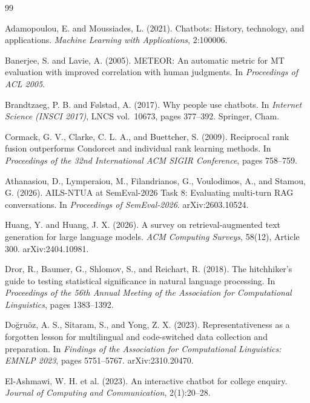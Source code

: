 \documentclass[a4paper,twoside]{article}
\begin{document}
{\small
\begin{thebibliography}{99}

 Adamopoulou, E. and Moussiades, L. (2021). Chatbots: History, technology, and applications. \textit{Machine Learning with Applications}, 2:100006.

 Banerjee, S. and Lavie, A. (2005). METEOR: An automatic metric for MT evaluation with improved correlation with human judgments. In \textit{Proceedings of ACL 2005}.

 Brandtzaeg, P. B. and F{\o}lstad, A. (2017). Why people use chatbots. In \textit{Internet Science (INSCI 2017)}, LNCS vol.\ 10673, pages 377--392. Springer, Cham.

 Cormack, G. V., Clarke, C. L. A., and Buettcher, S. (2009). Reciprocal rank fusion outperforms Condorcet and individual rank learning methods. In \textit{Proceedings of the 32nd International ACM SIGIR Conference}, pages 758--759.

 Athanasiou, D., Lymperaiou, M., Filandrianos, G., Voulodimos, A., and Stamou, G. (2026). AILS-NTUA at SemEval-2026 Task 8: Evaluating multi-turn RAG conversations. In \textit{Proceedings of SemEval-2026}. arXiv:2603.10524.

 Huang, Y. and Huang, J. X. (2026). A survey on retrieval-augmented text generation for large language models. \textit{ACM Computing Surveys}, 58(12), Article 300. arXiv:2404.10981.

 Dror, R., Baumer, G., Shlomov, S., and Reichart, R. (2018). The hitchhiker's guide to testing statistical significance in natural language processing. In \textit{Proceedings of the 56th Annual Meeting of the Association for Computational Linguistics}, pages 1383--1392.

 Do\u{g}ru\"oz, A. S., Sitaram, S., and Yong, Z. X. (2023). Representativeness as a forgotten lesson for multilingual and code-switched data collection and preparation. In \textit{Findings of the Association for Computational Linguistics: EMNLP 2023}, pages 5751--5767. arXiv:2310.20470.

 El-Ashmawi, W. H. et al. (2023). An interactive chatbot for college enquiry. \textit{Journal of Computing and Communication}, 2(1):20--28.


\end{thebibliography}}
\end{document}
